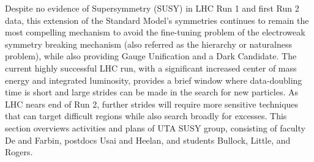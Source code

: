 Despite no evidence of Supersymmetry (SUSY) in LHC Run 1 and first Run
2 data, this extension of the Standard Model's symmetries continues to
remain the most compelling mechanism to avoid the fine-tuning problem
of the electroweak symmetry breaking mechanism (also referred as the
hierarchy or naturalness problem), while also providing Gauge
Unification and a Dark Candidate. The current highly successful LHC
run, with a significant increased center of mass energy and integrated
luminosity, provides a brief window where data-doubling time is short
and large strides can be made in the search for new particles. As LHC
nears end of Run 2, further strides will require more sensitive
techniques that can target difficult regions while also search broadly
for excesses. This section overviews activities and plans of UTA SUSY
group, consisting of faculty De and Farbin, postdocs Usai and Heelan,
and students Bullock, Little, and Rogers.


